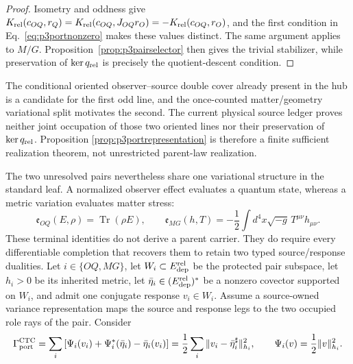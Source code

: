 \begin{proof}
Isometry and oddness give
$K_{\rm rel}(c_{OQ},r_Q)=
K_{\rm rel}(c_{OQ},J_{OQ}r_O)=
-K_{\rm rel}(c_{OQ},r_O)$, and the first condition in
Eq.~\eqref{eq:p3portnonzero} makes these values distinct. The same argument
applies to $M/G$. Proposition~\ref{prop:p3pairselector} then gives the
trivial stabilizer, while preservation of $\ker q_{\rm rel}$ is precisely
the quotient-descent condition.
\end{proof}

The conditional oriented observer--source double cover already present in
the hub is a candidate for the first odd line, and the once-counted
matter/geometry variational split motivates the second. The current physical
source ledger proves neither joint occupation of those two oriented lines nor
their preservation of $\ker q_{\rm rel}$. Proposition
\ref{prop:p3portrepresentation} is therefore a finite sufficient realization
theorem, not unrestricted parent-law realization.

The two unresolved pairs nevertheless share one variational structure in the
standard leaf. A normalized observer effect evaluates a quantum state,
whereas a metric variation evaluates matter stress:
\begin{equation}
 \mathfrak e_{OQ}(E,\rho)=\operatorname{Tr}(\rho E),
 \qquad
 \mathfrak e_{MG}(h,T)
 =-\frac12\int d^4x\sqrt{-g}\,T^{\mu\nu}h_{\mu\nu}.
 \label{eq:p3dualevaluations}
\end{equation}
These terminal identities do not derive a parent carrier. They do require
every differentiable completion that recovers them to retain two typed
source/response dualities. Let $i\in\{OQ,MG\}$, let
$W_i\subset E_{\rm dep}^{\rm rel}$ be the protected pair subspace, let $h_i>0$
be its inherited metric, let
$\bar\eta_i\in(E_{\rm dep}^{\rm rel})^*$ be a nonzero covector supported on
$W_i$, and admit one conjugate response $v_i\in W_i$. Assume a source-owned
variance representation maps the source and response legs to the two occupied
role rays of the pair. Consider
\begin{equation}
 \Gamma_{\rm port}^{\rm CTC}
 =\sum_i\left[\Psi_i(v_i)+\Psi_i^*(\bar\eta_i)-\bar\eta_i(v_i)\right]
 =\frac12\sum_i\|v_i-\bar\eta_i^\sharp\|_{h_i}^2,
 \qquad \Psi_i(v)=\frac12\|v\|_{h_i}^2.
 \label{eq:p3bicotangent}
\end{equation}

